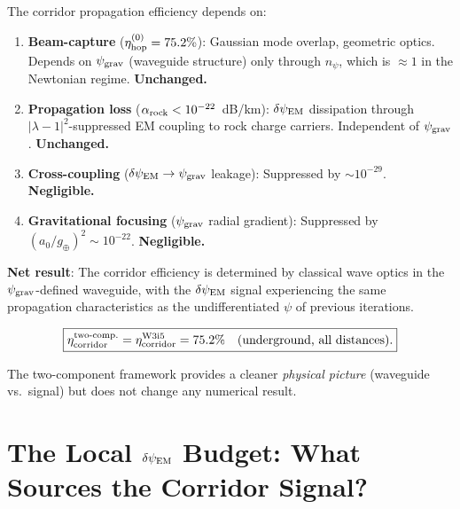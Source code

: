 \documentclass[11pt]{article}
\newcommand{\psigrav}{\psi_{\rm grav}}
\newcommand{\dpsiEM}{\delta\psi_{\rm EM}}
\newcommand{\lambdaone}{|\lambda{-}1|}
\newcommand{\etahop}{\eta_{\rm hop}}
\newcommand{\alpharock}{\alpha_{\rm rock}}
\newcommand{\npsi}{n_\psi}
\begin{document}
\begin{tcolorbox}[colback=green!5!white, colframe=green!60!black,
  title=\textbf{Answer: Corridor Efficiency Is Unchanged by Two-Component Decomposition}]

The corridor propagation efficiency depends on:
\begin{enumerate}[nosep]
  \item \textbf{Beam-capture} ($\etahop^{(0)} = 75.2\%$): Gaussian mode
    overlap, geometric optics. Depends on $\psigrav$ (waveguide structure)
    only through $\npsi$, which is $\approx 1$ in the Newtonian regime.
    \textbf{Unchanged.}
  \item \textbf{Propagation loss} ($\alpharock < 10^{-22}$~dB/km):
    $\dpsiEM$ dissipation through $\lambdaone^2$-suppressed EM coupling
    to rock charge carriers. Independent of $\psigrav$.
    \textbf{Unchanged.}
  \item \textbf{Cross-coupling} ($\dpsiEM \to \psigrav$ leakage):
    Suppressed by $\sim 10^{-29}$. \textbf{Negligible.}
  \item \textbf{Gravitational focusing} ($\psigrav$ radial gradient):
    Suppressed by $(a_0/g_\oplus)^2 \sim 10^{-22}$. \textbf{Negligible.}
\end{enumerate}

\textbf{Net result}: The corridor efficiency is determined by classical
wave optics in the $\psigrav$-defined waveguide, with the $\dpsiEM$
signal experiencing the same propagation characteristics as the
undifferentiated $\psi$ of previous iterations.

\begin{equation}
\boxed{\eta_{\rm corridor}^{\rm two\text{-}comp.}
= \eta_{\rm corridor}^{\rm W3i5} = 75.2\%
\quad\text{(underground, all distances).}}
\end{equation}

The two-component framework provides a cleaner \emph{physical picture}
(waveguide vs.\ signal) but does not change any numerical result.
\end{tcolorbox}

\section{The Local $\dpsiEM$ Budget: What Sources the Corridor Signal?}
\label{sec:local-dpsi}
\end{document}
